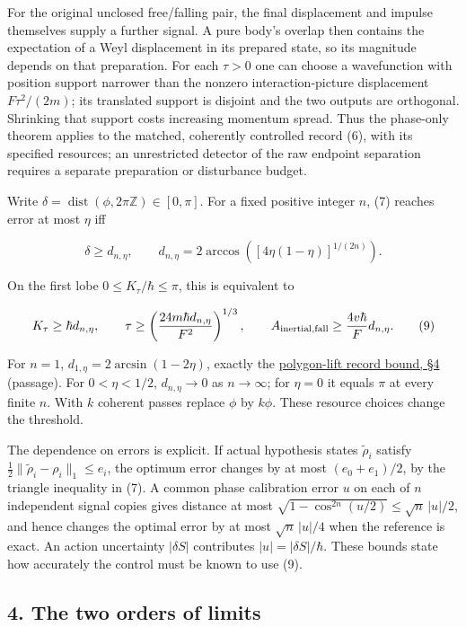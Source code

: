 \documentclass[11pt,a4paper]{article}
\begin{document}
For the original unclosed free/falling pair, the final displacement and
impulse themselves supply a further signal. A pure body's overlap then
contains the expectation of a Weyl displacement in its prepared state,
so its magnitude depends on that preparation. For each \(\tau>0\) one
can choose a wavefunction with position support narrower than the
nonzero interaction-picture displacement \(F\tau^2/(2m)\); its
translated support is disjoint and the two outputs are orthogonal.
Shrinking that support costs increasing momentum spread. Thus the
phase-only theorem applies to the matched, coherently controlled record
(6), with its specified resources; an unrestricted detector of the raw
endpoint separation requires a separate preparation or disturbance
budget.

Write \(\delta=\operatorname{dist}(\phi,2\pi\mathbb Z)\in[0,\pi]\). For
a fixed positive integer \(n\), (7) reaches error at most \(\eta\) iff

\[
\delta\ge d_{n,\eta},\qquad
d_{n,\eta}=2\arccos\left([4\eta(1-\eta)]^{1/(2n)}\right).
\tag{8}
\]

On the first lobe \(0\le K_\tau/\hbar\le\pi\), this is equivalent to

\[
K_\tau\ge\hbar d_{n,\eta},\qquad
\tau\ge\left(\frac{24m\hbar d_{n,\eta}}{F^2}\right)^{1/3},
\qquad A_{\rm inertial,fall}\ge\frac{4v\hbar}{F}d_{n,\eta}.
\tag{9}
\]

For \(n=1\), \(d_{1,\eta}=2\arcsin(1-2\eta)\), exactly the
\href{cut-measure-newton.md\#weyl-lifting-and-polygon-phases}{polygon-lift
record bound, §4} (passage). For \(0<\eta<1/2\), \(d_{n,\eta}\to0\) as
\(n\to\infty\); for \(\eta=0\) it equals \(\pi\) at every finite \(n\).
With \(k\) coherent passes replace \(\phi\) by \(k\phi\). These resource
choices change the threshold.

The dependence on errors is explicit. If actual hypothesis states
\(\widetilde\rho_i\) satisfy
\(\tfrac12\|\widetilde\rho_i-\rho_i\|_1\le e_i\), the optimum error
changes by at most \((e_0+e_1)/2\), by the triangle inequality in (7). A
common phase calibration error \(u\) on each of \(n\) independent signal
copies gives distance at most
\(\sqrt{1-\cos^{2n}(u/2)}\le\sqrt n\,|u|/2\), and hence changes the
optimal error by at most \(\sqrt n\,|u|/4\) when the reference is exact.
An action uncertainty \(|\delta S|\) contributes
\(|u|=|\delta S|/\hbar\). These bounds state how accurately the control
must be known to use (9).

\subsection{4. The two orders of limits}\label{the-two-orders-of-limits}
\end{document}
